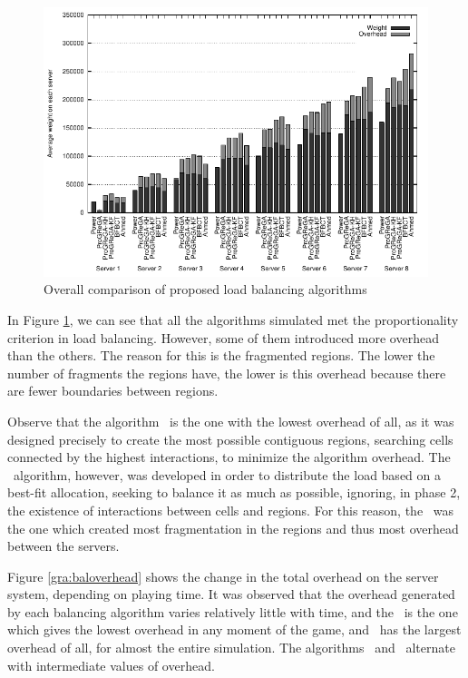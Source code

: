 \begin{figure}[!t]
  \centering
  \includegraphics[width=1.0\linewidth]{images/baloverall_ah}
  \caption{Overall comparison of proposed load balancing algorithms}
  \label{gra:baloverall}
\end{figure}

In Figure \ref{gra:baloverall}, we can see that all the algorithms simulated met the proportionality criterion in load balancing. However, some of them introduced more overhead than the others. The reason for this is the fragmented regions. The lower the number of fragments the regions have, the lower is this overhead because there are fewer boundaries between regions.

Observe that the algorithm \ggp\ is the one with the lowest overhead of all, as it was designed precisely to create the most possible contiguous regions, searching cells connected by the highest interactions, to minimize the algorithm overhead. The \bfa\ algorithm, however, was developed in order to distribute the load based on a best-fit allocation, seeking to balance it as much as possible, ignoring, in phase 2, the existence of interactions between cells and regions. For this reason, the \bfa\ was the one which created most fragmentation in the regions and thus most overhead between the servers.


Figure \ref{gra:baloverhead} shows the change in the total overhead on the server system, depending on playing time. It was observed that the overhead generated by each balancing algorithm varies relatively little with time, and the \ggp\ is the one which gives the lowest overhead in any moment of the game, and \bfa\ has the largest overhead of all, for almost the entire simulation. The algorithms \ggpk\ and \ggpf\ alternate with intermediate values of overhead. 

